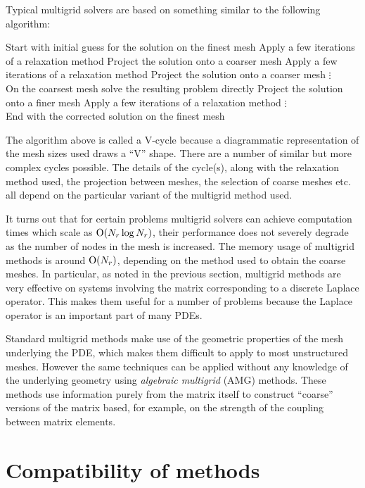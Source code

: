 Typical multigrid solvers are based on something similar to the following algorithm:

\begin{algorithm}[H]
Start with initial guess for the solution on the finest mesh\;
Apply a few iterations of a relaxation method\;
Project the solution onto a coarser mesh\;
Apply a few iterations of a relaxation method\;
Project the solution onto a coarser mesh\;
\qquad $\vdots$\\
On the coarsest mesh solve the resulting problem directly\;
Project the solution onto a finer mesh\;
Apply a few iterations of a relaxation method\;
\qquad $\vdots$\\
End with the corrected solution on the finest mesh\;
\end{algorithm}

The algorithm above is called a V-cycle because a diagrammatic representation of the mesh sizes used draws a ``V'' shape.
There are a number of similar but more complex cycles possible.
The details of the cycle(s), along with the relaxation method used, the projection between meshes, the selection of coarse meshes etc. all depend on the particular variant of the multigrid method used.

It turns out that for certain problems multigrid solvers can achieve computation times which scale as $\mathrm{O}{\left( N_r \log N_r \right)}$, \ie their performance does not severely degrade as the number of nodes in the mesh is increased.
The memory usage of multigrid methods is around $\mathrm{O}{\left( N_r \right)}$, depending on the method used to obtain the coarse meshes.
In particular, as noted in the previous section, multigrid methods are very effective on systems involving the matrix corresponding to a discrete Laplace operator.
This makes them useful for a number of problems because the Laplace operator is an important part of many PDEs.

Standard multigrid methods make use of the geometric properties of the mesh underlying the PDE, which makes them difficult to apply to most unstructured meshes.
However the same techniques can be applied without any knowledge of the underlying geometry using \emph{algebraic multigrid} (AMG) methods.
These methods use information purely from the matrix itself to construct ``coarse'' versions of the matrix based, for example, on the strength of the coupling between matrix elements.



\section{Compatibility of methods}
\label{sec:comp-meth}

